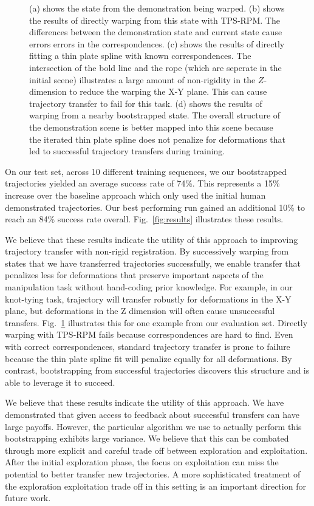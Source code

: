 \begin{figure}
{  (a) shows the state from the demonstration being warped. (b) shows the results of directly warping from this state with TPS-RPM. The differences between the demonstration state and current state cause errors errors in the correspondences. (c) shows the results of directly fitting a thin plate spline with known correspondences. The intersection of the bold line and the rope (which are seperate in the initial scene) illustrates a large amount of non-rigidity in the $Z$-dimension to reduce the warping the X-Y plane. This can cause trajectory transfer to fail for this task. (d) shows the results of warping from a nearby bootstrapped state. The overall structure of the demonstration scene is better mapped into this scene because the iterated thin plate spline does not penalize for deformations that led to successful trajectory transfers during training.}
  \label{fig:warps}
\end{figure}



On our test set, across 10 different training sequences, we our bootstrapped trajectories
yielded an average success rate of 74\%. This represents a 15\% increase over the baseline 
approach which only used the initial human demonstrated trajectories. Our best performing
run gained an additional 10\% to reach an 84\% success rate overall. Fig.~\ref{fig:results} 
illustrates these results.

We believe that these results indicate the utility of this approach to improving
trajectory transfer with non-rigid registration. By successively warping from 
states that we have transferred trajectories successfully, we enable transfer
that penalizes less for deformations that preserve important aspects of the manipulation
task without hand-coding prior knowledge. For example, in our knot-tying task, trajectory 
will transfer robustly for deformations in the X-Y plane, but deformations in the Z dimension
will often cause unsuccessful transfers. Fig.~\ref{fig:warps} illustrates this for one
example from our evaluation set. Directly warping with TPS-RPM fails because correspondences 
are hard to find. Even with correct correspondences, standard trajectory transfer is
prone to failure because the thin plate spline fit will penalize equally for all deformations.
By contrast, bootstrapping from successful trajectories discovers this structure
and is able to leverage it to succeed. 

We believe that these results indicate the utility of this approach. We have demonstrated that
given access to feedback about successful transfers can have large payoffs. However,
the particular algorithm we use to actually perform this bootstrapping exhibits large variance.
We believe that this can be combated through more explicit and careful trade off between
exploration and exploitation. After the initial exploration phase, the focus on exploitation
can miss the potential to better transfer new trajectories. A more sophisticated treatment
of the exploration exploitation trade off in this setting is an important direction for future work.


